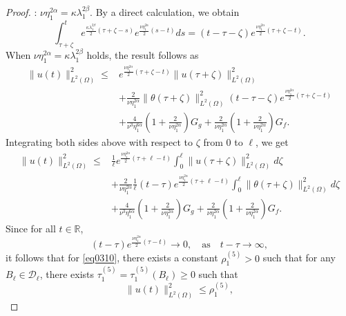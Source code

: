 \documentclass[oneside,preprint,12pt,numbers,sort&compress]{elsarticle}
\begin{document}
\begin{proof}
: $\nu\eta_1^{2\alpha} = \kappa\lambda_1^{2\beta}$. By a direct calculation, we obtain
\[
\int_{\tau+\zeta}^{t} e^{\frac{\kappa\lambda_{1}^{2\beta}}{2}(\tau+\zeta-s)} e^{\frac{\nu\eta_1^{2\alpha}}{2}(s-t)} ds = (t - \tau - \zeta)e^{\frac{\nu\eta_1^{2\alpha}}{2}(\tau+\zeta - t)}.
\]
When \(\nu\eta_1^{2\alpha} = \kappa\lambda_1^{2\beta}\) holds, the result follows as 
\begin{equation}\label{eq0306}
\begin{aligned} 
   \|u(t)\|_{L^2(\Omega)}^2
   \leq 
   & e^{\frac{\nu\eta_1^{2\alpha}}{2}(\tau+\zeta-t)} \|u(\tau+\zeta)\|_{L^2(\Omega)}^2 
   \\
   &
   + \frac{2}{\nu\eta_1^{2\alpha}} \|\theta(\tau+\zeta)\|_{L^2(\Omega)}^2  (t - \tau - \zeta)e^{\frac{\nu\eta_1^{2\alpha}}{2}(\tau+\zeta - t)} \\
   &
   + \frac{4}{\nu^{3}\eta_1^{6\alpha}} 
   \left(1+\frac{2}{\nu\eta_1^{2\alpha}}\right)G_g
   + \frac{2}{\nu\eta_1^{2\alpha}} \left(1+\frac{2}{\nu\eta_1^{2\alpha}}\right)G_f.
\end{aligned}
\end{equation}
Integrating both sides above with respect to $\zeta$ from $0$ to $\ell$, we get
\begin{equation}\label{eq0310}
\begin{aligned} 
   \|u(t)\|_{L^2(\Omega)}^2
   \leq 
   & \frac{1}{\ell} e^{\frac{\nu\eta_1^{2\alpha}}{2}(\tau+\ell-t)}  \int_{0}^{\ell} \|u(\tau+\zeta)\|_{L^2(\Omega)}^2 d\zeta
    \\
   &
   + \frac{2}{\nu\eta_1^{2\alpha}}
   \frac{1}{\ell}(t-\tau)
   e^{\frac{\nu\eta_1^{2\alpha}}{2}(\tau+\ell-t)}
   \int_{0}^{\ell} 
   \|\theta(\tau+\zeta)\|_{L^2(\Omega)}^2  d\zeta \\
   &
   + \frac{4}{\nu^{3}\eta_1^{6\alpha}} 
   \left(1+\frac{2}{\nu\eta_1^{2\alpha}}\right)
   G_g
   + \frac{2}{\nu\eta_1^{2\alpha}} \left(1+\frac{2}{\nu\eta_1^{2\alpha}}\right)G_f.
\end{aligned}
\end{equation}
Since for all $ t \in \mathbb{R} $, 
\[
(t-\tau)e^{\frac{\nu\eta_1^{2\alpha}}{2}(\tau-t)}
\to 0, \quad\text{as}\quad t - \tau \to \infty, 
\]
it follows that for \cref{eq0310}, there exists a constant $\rho_{1}^{(5)} > 0$ such that for any $B_{\ell} \in \mathcal{D}_{\ell}$, there exists $\tau_{1}^{(5)} = \tau_{1}^{(5)}(B_{\ell}) \geq 0$ such that 
\begin{equation}\label{eq0313}
    \|u(t)\|_{L^2(\Omega)}^2 
    \leq 
    \rho_{1}^{(5)},
\end{equation} 

\end{proof}
\end{document}
